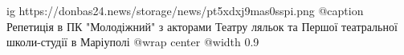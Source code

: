  
 
 
 
 

\ifcmt
  ig https://donbas24.news/storage/news/pt5xdxj9mas0sspi.png
	@caption Репетиція в ПК "Молодіжний" з акторами Театру ляльок та Першої театральної школи-студії в Маріуполі
  @wrap center
  @width 0.9
\fi
